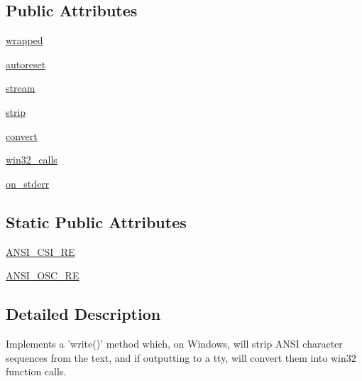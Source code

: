 \subsection*{Public Attributes}
\begin{DoxyCompactItemize}
\item 
\hyperlink{classpip_1_1__vendor_1_1colorama_1_1ansitowin32_1_1AnsiToWin32_a34af25ac3c344b7b7c022e659c320f53}{wrapped}
\item 
\hyperlink{classpip_1_1__vendor_1_1colorama_1_1ansitowin32_1_1AnsiToWin32_aca16010cfb73f29db60437346f928489}{autoreset}
\item 
\hyperlink{classpip_1_1__vendor_1_1colorama_1_1ansitowin32_1_1AnsiToWin32_a5d5eeb3d9059447945927bd26e27740d}{stream}
\item 
\hyperlink{classpip_1_1__vendor_1_1colorama_1_1ansitowin32_1_1AnsiToWin32_a6f241d452547c3d8f90d0b786223d21b}{strip}
\item 
\hyperlink{classpip_1_1__vendor_1_1colorama_1_1ansitowin32_1_1AnsiToWin32_a93dc9a71774f9f8e323c8b89478da717}{convert}
\item 
\hyperlink{classpip_1_1__vendor_1_1colorama_1_1ansitowin32_1_1AnsiToWin32_a616e824bac074e6c9bbbe17bb9dbc736}{win32\+\_\+calls}
\item 
\hyperlink{classpip_1_1__vendor_1_1colorama_1_1ansitowin32_1_1AnsiToWin32_ac41f24fe75f397441494eaf12b791c26}{on\+\_\+stderr}
\end{DoxyCompactItemize}
\subsection*{Static Public Attributes}
\begin{DoxyCompactItemize}
\item 
\hyperlink{classpip_1_1__vendor_1_1colorama_1_1ansitowin32_1_1AnsiToWin32_ac11ead9b750ce7fbda5e16e6f5d5b4c9}{A\+N\+S\+I\+\_\+\+C\+S\+I\+\_\+\+RE}
\item 
\hyperlink{classpip_1_1__vendor_1_1colorama_1_1ansitowin32_1_1AnsiToWin32_aee7c8ec8c14feb3da95d7d6f887ba6ed}{A\+N\+S\+I\+\_\+\+O\+S\+C\+\_\+\+RE}
\end{DoxyCompactItemize}


\subsection{Detailed Description}
\begin{DoxyVerb}Implements a 'write()' method which, on Windows, will strip ANSI character
sequences from the text, and if outputting to a tty, will convert them into
win32 function calls.
\end{DoxyVerb}
 

